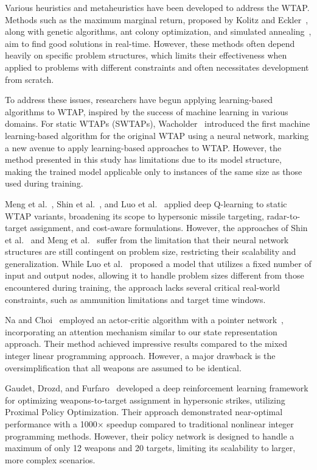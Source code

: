 \documentclass{ieeeaccess}
\begin{document}
Various heuristics and metaheuristics have been developed to address the WTAP. Methods such as the maximum marginal return, proposed by Kolitz and Eckler~\cite{kolitz1988analysis}, along with genetic algorithms, ant colony optimization, and simulated annealing~\cite{lee2002immunity,lee2003efficiently,durgut2017artificial,sonuc2017parallel,chang2018solving,metler1990suite}, aim to find good solutions in real-time. However, these methods often depend heavily on specific problem structures, which limits their effectiveness when applied to problems with different constraints and often necessitates development from scratch.

To address these issues, researchers have begun applying learning-based algorithms to WTAP, inspired by the success of machine learning in various domains. For static WTAPs (SWTAPs), Wacholder~\cite{wacholder1989neural} introduced the first machine learning-based algorithm for the original WTAP using a neural network, marking a new avenue to apply learning-based approaches to WTAP. However, the method presented in this study has limitations due to its model structure, making the trained model applicable only to instances of the same size as those used during training.

Meng et al.~\cite{meng2021deep}, Shin et al.~\cite{shin2020mean}, and Luo et al.~\cite{luo2021learning} applied deep Q-learning to static WTAP variants, broadening its scope to hypersonic missile targeting, radar-to-target assignment, and cost-aware formulations. However, the approaches of Shin et al.~\cite{shin2020mean} and Meng et al.~\cite{meng2021deep} suffer from the limitation that their neural network structures are still contingent on problem size, restricting their scalability and generalization. While Luo et al.~\cite{luo2021learning} proposed a model that utilizes a fixed number of input and output nodes, allowing it to handle problem sizes different from those encountered during training, the approach lacks several critical real-world constraints, such as ammunition limitations and target time windows.

Na and Choi~\cite{na2023weapon} employed an actor-critic algorithm with a pointer network~\cite{vinyals2015pointer}, incorporating an attention mechanism similar to our state representation approach. Their method achieved impressive results compared to the mixed integer linear programming approach. However, a major drawback is the oversimplification that all weapons are assumed to be identical.

Gaudet, Drozd, and Furfaro~\cite{gaudet2023} developed a deep reinforcement learning framework for optimizing weapons-to-target assignment in hypersonic strikes, utilizing Proximal Policy Optimization. Their approach demonstrated near-optimal performance with a 1000$\times$ speedup compared to traditional nonlinear integer programming methods. However, their policy network is designed to handle a maximum of only 12 weapons and 20 targets, limiting its scalability to larger, more complex scenarios.
\end{document}

